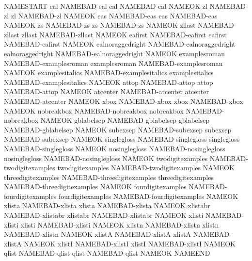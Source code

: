 
\makeatletter
\newcommand\chk[1]{\expandafter\ifx\csname #1\endcsname\relax
  NAMEBAD-#1 \else\expandafter\ifx\csname #1\endcsname\@undefined
  NAMEBAD-#1 \else NAMEOK \fi\fi}
\makeatother

NAMESTART
\chk{eal}\chk{zl}\chk{eas}\chk{zs}\chk{zllast}\chk{eafirst}
\chk{ealnoraggedright}\chk{examplesroman}\chk{examplesitalics}
\chk{attop}\chk{atcenter}\chk{xbox}\chk{nobreakbox}
\chk{gblabelsep}\chk{subexsep}\chk{singlegloss}\chk{nosinglegloss}
\chk{twodigitexamples}\chk{threedigitexamples}\chk{fourdigitexamples}
\chk{xlista}\chk{xlistabr}\chk{xlisti}\chk{xlistn}\chk{xlistA}\chk{xlistI}
\chk{qlist}
NAMEEND

